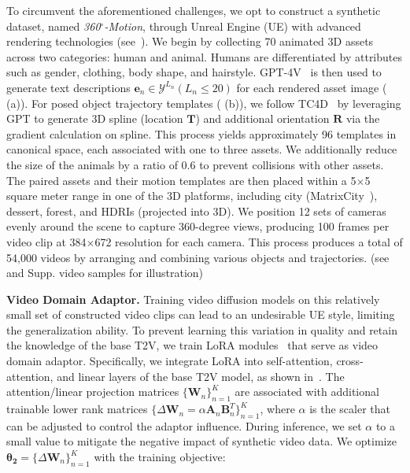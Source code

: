 To circumvent the aforementioned challenges, we opt to construct a synthetic dataset, named \textit{360$^{\circ}$-Motion}, through Unreal Engine (UE) with advanced rendering technologies (see~). We begin by collecting 70 animated 3D assets across two categories: human and animal. Humans are differentiated by attributes such as gender, clothing, body shape, and hairstyle. GPT-4V~\citep{openai2023gpt4v} is then used to generate text descriptions $\mathbf{e}_n \in \mathcal{Y}^{L_n} ({L_n} \leq 20)$ for each rendered asset image ( (a)). For posed object trajectory templates ( (b)), we follow TC4D~\citep{bahmani2024tc4d} by leveraging GPT to generate 3D spline (location $\mathbf{T}$) and additional orientation $\mathbf{R}$ via the gradient calculation on spline. This process yields approximately 96 templates in canonical space, each associated with one to three assets. We additionally reduce the size of the animals by a ratio of 0.6 to prevent collisions with other assets. The paired assets and their motion templates are then placed within a 5$\times$5 square meter range in one of the 3D platforms, including city (MatrixCity~\citep{li2023matrixcity}), dessert, forest, and HDRIs (projected into 3D). We position 12 sets of cameras evenly around the scene to capture 360-degree views, producing 100 frames per video clip at 384$\times$672 resolution for each camera. This process produces a total of 54,000 videos by arranging and combining various objects and trajectories. (see~ and Supp. video samples for illustration)

\noindent \textbf{Video Domain Adaptor.} Training video diffusion models on this relatively small set of constructed video clips can lead to an undesirable UE style, limiting the generalization ability. To prevent learning this variation in quality and retain the knowledge of the base T2V, we train LoRA modules~\citep{hu2021lora} that serve as video domain adaptor. Specifically, we integrate LoRA into self-attention, cross-attention, and linear layers of the base T2V model, as shown in~. The attention/linear projection matrices $\{\mathbf{W}_n\}_{n=1}^K$ are associated with additional trainable lower rank matrices $\{\Delta\mathbf{W}_n=\alpha \mathbf{A}_n \mathbf{B}_n^T\}_{n=1}^K$, where $\alpha$ is the scaler that can be adjusted to control the adaptor influence. During inference, we set $\alpha$ to a small value to mitigate the negative impact of synthetic video data. We optimize $\boldsymbol{\theta_2}=\{\Delta\mathbf{W}_n\}_{n=1}^K$ with the training objective:

